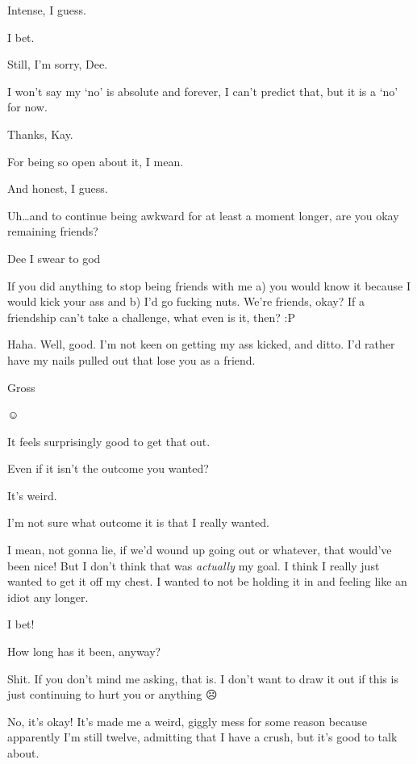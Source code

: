  Intense, I guess.

 I bet.

 Still, I'm sorry, Dee.

 I won't say my `no' is absolute and forever, I can't predict that, but it is a `no' for now.

 Thanks, Kay.

 For being so open about it, I mean.

 And honest, I guess.

 Uh\ldots and to continue being awkward for at least a moment longer, are you okay remaining friends?

 Dee I swear to god

 If you did anything to stop being friends with me a) you would know it because I would kick your ass and b) I'd go fucking nuts. We're friends, okay? If a friendship can't take a challenge, what even is it, then? :P

 Haha. Well, good. I'm not keen on getting my ass kicked, and ditto. I'd rather have my nails pulled out that lose you as a friend.

 Gross

 ☺

 It feels surprisingly good to get that out.

 Even if it isn't the outcome you wanted?

 It's weird.

 I'm not sure what outcome it is that I really wanted.

 I mean, not gonna lie, if we'd wound up going out or whatever, that would've been nice! But I don't think that was \emph{actually} my goal. I think I really just wanted to get it off my chest. I wanted to not be holding it in and feeling like an idiot any longer.

 I bet!

 How long has it been, anyway?

 Shit. If you don't mind me asking, that is. I don't want to draw it out if this is just continuing to hurt you or anything ☹

 No, it's okay! It's made me a weird, giggly mess for some reason because apparently I'm still twelve, admitting that I have a crush, but it's good to talk about.

